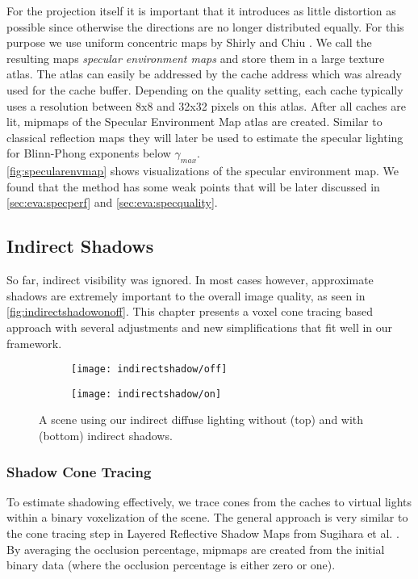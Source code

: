 \documentclass[thesis.tex]{subfiles}
\begin{document}
For the projection itself it is important that it introduces as little distortion as possible since otherwise the directions are no longer distributed equally.
For this purpose we use uniform concentric maps by Shirly and Chiu \cite{bib:concentricmaps}.
We call the resulting maps \emph{specular environment maps} and store them in a large texture atlas.
The atlas can easily be addressed by the cache address which was already used for the cache buffer.
Depending on the quality setting, each cache typically uses a resolution between 8x8 and 32x32 pixels on this atlas.
After all caches are lit, mipmaps of the Specular Environment Map atlas are created.
Similar to classical reflection maps \cite[p.~308]{bib:RealtimeRenderingBook} they will later be used to estimate the specular lighting for Blinn-Phong exponents below $\gamma_{max}$.
\\
\autoref{fig:specularenvmap} shows visualizations of the specular environment map.
We found that the method has some weak points that will be later discussed in \autoref{sec:eva:specperf} and \autoref{sec:eva:specquality}.


\subsection{Indirect Shadows} \label{sec:main:shadowing}
So far, indirect visibility was ignored.
In most cases however, approximate shadows are extremely important to the overall image quality, as seen in \autoref{fig:indirectshadowonoff}.
This chapter presents a voxel cone tracing based approach with several adjustments and new simplifications that fit well in our framework.
\begin{figure}[h!]
\centering
\begin{subfigure}[b]{\textwidth}
	\texttt{[image: indirectshadow/off]}
\end{subfigure}

\vspace{8pt}
\begin{subfigure}[b]{\textwidth}
	\texttt{[image: indirectshadow/on]}
\end{subfigure}
\caption{A scene using our indirect diffuse lighting without (top) and with (bottom) indirect shadows.}
\label{fig:indirectshadowonoff}
\end{figure}

\subsubsection{Shadow Cone Tracing}\label{sec:impl:voxelization}
To estimate shadowing effectively, we trace cones from the caches to virtual lights within a binary voxelization of the scene.
The general approach is very similar to the cone tracing step in Layered Reflective Shadow Maps from Sugihara et al. \cite{bib:layeredrsm}. %
By averaging the occlusion percentage, mipmaps are created from the initial binary data (where the occlusion percentage is either zero or one).
\end{document}
